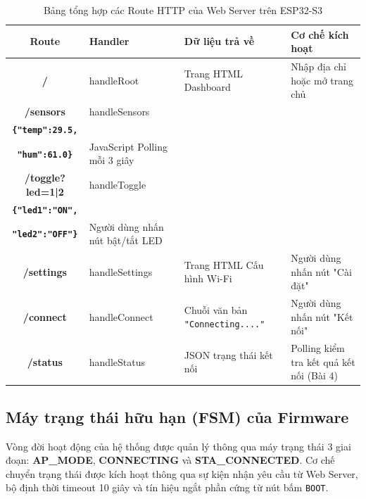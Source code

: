 \begin{table}[H]
\centering
\begin{tabularx}{\textwidth}{|>{\ttfamily\bfseries}c|>{\ttfamily}m{3.2cm}|>{\centering\arraybackslash}m{4.2cm}|X|}
\hline
\rowcolor{codeframe!40}
\textbf{Route} & \textbf{Handler} & \textbf{Dữ liệu trả về} & \textbf{Cơ chế kích hoạt} \\
\hline
/ & handleRoot & Trang HTML Dashboard & Nhập địa chỉ hoặc mở trang chủ \\
\hline
/sensors & handleSensors & \begin{tabular}{@{}c@{}}JSON \\ \texttt{\{"temp":29.5,} \\ \texttt{"hum":61.0\}}\end{tabular} & JavaScript Polling mỗi 3 giây \\
\hline
/toggle?led=1|2 & handleToggle & \begin{tabular}{@{}c@{}}JSON \\ \texttt{\{"led1":"ON",} \\ \texttt{"led2":"OFF"\}}\end{tabular} & Người dùng nhấn nút bật/tắt LED \\
\hline
/settings & handleSettings & Trang HTML Cấu hình Wi-Fi & Người dùng nhấn nút "Cài đặt" \\
\hline
/connect & handleConnect & Chuỗi văn bản \texttt{"Connecting...."} & Người dùng nhấn nút "Kết nối" \\
\hline
/status & handleStatus & JSON trạng thái kết nối & Polling kiểm tra kết quả kết nối (Bài 4) \\
\hline
\end{tabularx}
\caption{Bảng tổng hợp các Route HTTP của Web Server trên ESP32-S3}
\label{tab:http-routes}
\end{table}

\subsection{Máy trạng thái hữu hạn (FSM) của Firmware}
Vòng đời hoạt động của hệ thống được quản lý thông qua máy trạng thái 3 giai đoạn: \textbf{AP\_MODE}, \textbf{CONNECTING} và \textbf{STA\_CONNECTED}. Cơ chế chuyển trạng thái được kích hoạt thông qua sự kiện nhận yêu cầu từ Web Server, bộ định thời timeout 10 giây và tín hiệu ngắt phần cứng từ nút bấm \texttt{BOOT}.


